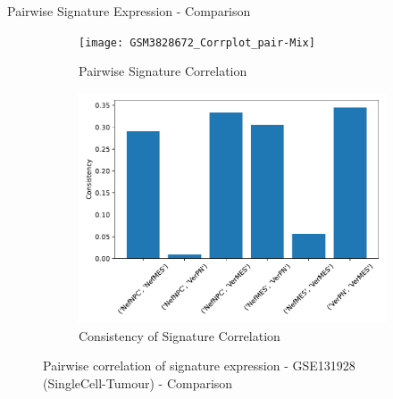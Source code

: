 \documentclass[aspectratio=169,9pt]{beamer}
\begin{document}
    \begin{frame}{Pairwise Signature Expression - Comparison}
        \begin{adjustwidth}{-5cm}{-5cm}
            \centering
            \begin{figure}\ContinuedFloat
                \centering
                \begin{subfigure}[c]{0.7\textwidth}
                    \centering
                    \texttt{[image: GSM3828672\_Corrplot\_pair-Mix]}
                    \caption{Pairwise Signature Correlation}
                \end{subfigure}
                \begin{subfigure}[c]{0.4\textwidth}
                    \centering
                    \includegraphics[width=\textwidth]{GSM3828672_Consistency_Mix}
                    \caption{Consistency of Signature Correlation}
                \end{subfigure}
                \caption{Pairwise correlation of signature expression - GSE131928 (SingleCell-Tumour) - Comparison}
            \end{figure}
        \end{adjustwidth}
    \end{frame}
\end{document}
